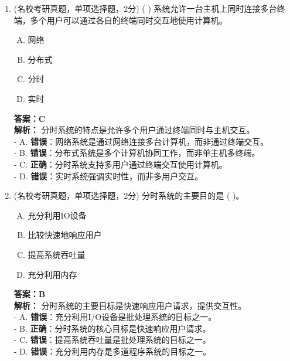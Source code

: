 \documentclass[lang=cn,newtx,10pt,scheme=chinese]{../../elegantbook}
\begin{document}
\begin{enumerate}
\item (名校考研真题，单项选择题，2分) (    ) 系统允许一台主机上同时连接多台终端，多个用户可以通过各自的终端同时交互地使用计算机。
    \begin{enumerate}[A.]
        \item 网络
        \item 分布式
        \item 分时
        \item 实时
    \end{enumerate}
    \textbf{答案：C}\\
    \textbf{解析：} 分时系统的特点是允许多个用户通过终端同时与主机交互。\\
    - A. \textbf{错误}：网络系统是通过网络连接多台计算机，而非通过终端交互。\\
    - B. \textbf{错误}：分布式系统是多个计算机协同工作，而非单主机多终端。\\
    - C. \textbf{正确}：分时系统支持多用户通过终端交互使用计算机。\\
    - D. \textbf{错误}：实时系统强调实时性，而非多用户交互。\\

\item (名校考研真题，单项选择题，2分) 分时系统的主要目的是 (    )。
    \begin{enumerate}[A.]
        \item 充分利用IO设备
        \item 比较快速地响应用户
        \item 提高系统吞吐量
        \item 充分利用内存
    \end{enumerate}
    \textbf{答案：B}\\
    \textbf{解析：} 分时系统的主要目标是快速响应用户请求，提供交互性。\\
    - A. \textbf{错误}：充分利用I/O设备是批处理系统的目标之一。\\
    - B. \textbf{正确}：分时系统的核心目标是快速响应用户请求。\\
    - C. \textbf{错误}：提高系统吞吐量是批处理系统的目标之一。\\
    - D. \textbf{错误}：充分利用内存是多道程序系统的目标之一。\\


\end{enumerate}
\end{document}
